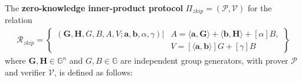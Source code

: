 \documentclass[../../book.tex]{subfiles}
\begin{document}
\begin{definition}
    The \textbf{zero-knowledge inner-product protocol} $\Pi_{zkip} = (\mathcal{P,V})$ for the relation 
    \begin{align*}
        \mathcal{R}_{zkip} = \left\{ \begin{aligned} (\mathbf{G,H},G,B,A,V;\mathbf{a,b},\alpha, \gamma) \vert & A = \langle \mathbf{a,G} \rangle + \langle \mathbf{b,H} \rangle + [\alpha] B, \\ & V = [\langle \mathbf{a,b} \rangle]G + [\gamma]B \end{aligned} \right\}
    \end{align*} 
    where $\mathbf{G,H} \in \mathbb{G}^n$ and $G,B \in \mathbb{G}$ are independent group generators, with prover $\mathcal{P}$ and verifier $\mathcal{V}$, is defined as follows:


\end{definition}
\end{document}
